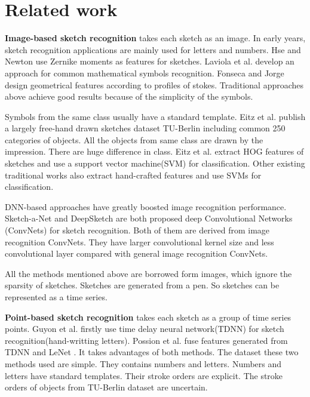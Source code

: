 \section{Related work}
\label{sec:related_work}

\textbf{Image-based sketch recognition} takes each sketch as an image. In early years, sketch recognition applications \cite{Hse2004SketchedSR, LaViola2004MathPad2AS, Fonseca2000UsingFL} are mainly used for letters and numbers. Hse and Newton \cite{Hse2004SketchedSR} use Zernike moments as features for sketches. Laviola et al. \cite{LaViola2004MathPad2AS} develop an approach for common mathematical symbols recognition. Fonseca and Jorge \cite{Fonseca2000UsingFL} design geometrical features  according to profiles of stokes. Traditional approaches above achieve good results because of the simplicity of the symbols.

Symbols from the same class usually have a standard template. Eitz et al. \cite{Eitz2012HowDH} publish a largely free-hand drawn sketches dataset TU-Berlin including common 250 categories of objects. All the objects from same class are drawn by the impression. There are huge difference in class. Eitz et al. extract HOG features of sketches and use a support vector machine(SVM) for classification. Other existing traditional works \cite{LiHSG15, Schneider2014SketchCA} also extract hand-crafted features and use SVMs for classification.

DNN-based approaches have greatly boosted image recognition performance. Sketch-a-Net \cite{Yu2015SketchaNetTB} and DeepSketch \cite{Seddati2015DeepSketchDC} are both proposed deep Convolutional Networks (ConvNets) for sketch recognition. Both of them are derived from image recognition ConvNets. They have larger convolutional kernel size and less convolutional layer compared with general image recognition ConvNets.

All the  methods mentioned above are borrowed form images, which ignore the sparsity of sketches. Sketches are generated from a pen. So sketches can be represented as a time series.

\textbf{Point-based sketch recognition} takes each sketch as a group of time series points. Guyon et al. \cite{SchenkelPenacEA} firstly use time delay neural network(TDNN) for sketch recognition(hand-writting letters). Possion et al. \cite{Poisson2002MultimodularAB} fuse features generated from TDNN and LeNet \cite{LeCun1998GradientbasedLA}. It takes advantages of both methods. The dataset these two methods used are simple. They contains numbers and letters. Numbers and letters have standard templates. Their stroke orders are explicit. The stroke orders of objects from TU-Berlin dataset are uncertain.

